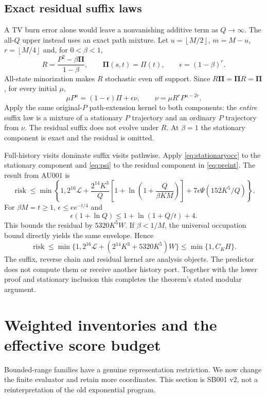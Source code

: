 \documentclass[11pt,letterpaper]{article}
\theoremstyle{definition}\newtheorem{definition}[theorem]{Definition}
\theoremstyle{remark}\newtheorem{remark}[theorem]{Remark}
\newcommand{\floor}[1]{\left\lfloor #1\right\rfloor}
\newcommand{\unit}[1]{\textsf{#1}}
\begin{document}
\subsection{Exact residual suffix laws}
A TV burn error alone would leave a nonvanishing additive term as $Q\to\infty$. The all-$Q$ upper instead uses an exact path mixture. Let $u=\floor{M/2}$, $m=M-u$, $r=\floor{M/4}$ and, for $0<\beta<1$,
\[
 R=\frac{P^2-\beta\mathbf\Pi}{1-\beta},\qquad
 \mathbf\Pi(s,t)=\Pi(t),\qquad \epsilon=(1-\beta)^r.
\]
All-state minorization makes $R$ stochastic even off support. Since $R\mathbf\Pi=\mathbf\Pi R=\mathbf\Pi$, for every initial $\mu$,
\begin{equation}\label{eq:mixture}
 \mu P^u=(1-\epsilon)\Pi+\epsilon\nu,
 \qquad \nu=\mu R^rP^{u-2r}.
\end{equation}
Apply the same original-$P$ path-extension kernel to both components: the \emph{entire} suffix law is a mixture of a stationary $P$ trajectory and an ordinary $P$ trajectory from $\nu$. The residual suffix does not evolve under $R$. At $\beta=1$ the stationary component is exact and the residual is omitted.

Full-history visits dominate suffix visits pathwise. Apply \eqref{eq:stationaryocc} to the stationary component and \eqref{eq:psi} to the residual component in \eqref{eq:preint}. The result from \unit{AU001} is
\[
 \operatorname{risk}\le\min\left\{1,2^{16}\mathcal L+
 \frac{2^{14}K^3}{Q}\left[1+\ln\left(1+\frac Q{\beta KM}\right)\right]
 +7\epsilon\Psi(152K^5/Q)\right\}.
\]
For $\beta M=t\ge1$, $\epsilon\le e e^{-t/4}$ and
\[
 \epsilon(1+\ln Q)\le1+\ln(1+Q/t)+4.
\]
This bounds the residual by $5320K^5W$. If $\beta<1/M$, the universal occupation bound directly yields the same envelope. Hence
\[
 \operatorname{risk}\le\min\{1,2^{16}\mathcal L+(2^{14}K^3+5320K^5)W\}
 \le\min\{1,C_KH\}.
\]
The suffix, reverse chain and residual kernel are analysis objects. The predictor does not compute them or receive another history port. Together with the lower proof and stationary inclusion this completes the theorem's stated modular argument.

\section{Weighted inventories and the effective score budget}\label{sec:score}
Bounded-range families have a genuine representation restriction. We now change the finite evaluator and retain more coordinates. This section is \unit{SB001 v2}, not a reinterpretation of the old exponential program.
\end{document}

